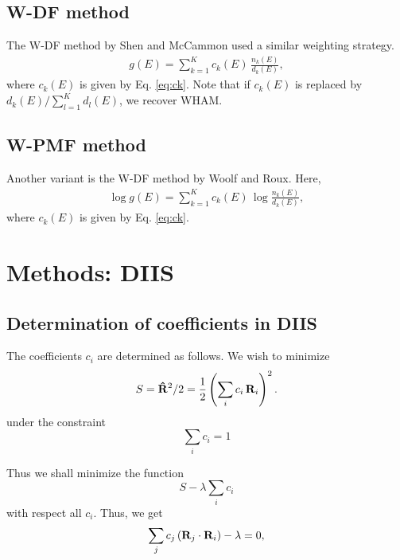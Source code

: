 \documentclass[aip,jcp,preprint,notitlepage, superscriptaddress]{revtex4-1}
\begin{document}
\subsection{W-DF method}



The W-DF method by Shen and McCammon\cite{
shen1991, roux1995}
used a similar weighting strategy.
%
\begin{align}
g(E) = \sum_{k = 1}^K c_k(E) \, \frac{ n_k(E) } { d_k(E) },
\end{align}
%
where $c_k(E)$ is given by Eq. \eqref{eq:ck}.
%
Note that
if $c_k(E)$
is replaced by $ d_k(E) / \sum_{l = 1}^K d_l(E)$,
we recover WHAM.



\subsection{W-PMF method}



Another variant is the W-DF method by Woolf and Roux\cite{
woolf1994, crouzy1994, roux1995}.
%
Here,
%
\begin{align}
\log g(E) = \sum_{k = 1}^K c_k(E) \, \log \frac{ n_k(E) } { d_k(E) },
\end{align}
%
where $c_k(E)$ is given by Eq. \eqref{eq:ck}.
%







\section{Methods: DIIS}


\subsection{Determination of coefficients in DIIS}



The coefficients $c_i$ are determined as follows.
%
We wish to minimize
%
\[
S
=
\mathbf{\hat R}^2 / 2
=
\frac 1 2 \left( \sum_i c_i \, \mathbf{R}_i \right)^2.
\]
under the constraint
%
\begin{equation}
\sum_i c_i = 1
\label{eq:c_normalize}
\end{equation}



Thus we shall minimize the function
\[
  S - \lambda \sum_i c_i
\]
with respect all $c_i$.
%
Thus, we get
\begin{equation}
  \sum_j c_j \, (\mathbf{R}_j \cdot \mathbf{R}_i) - \lambda = 0,
  \label{eq:cj_DIIS}
\end{equation}
\end{document}
